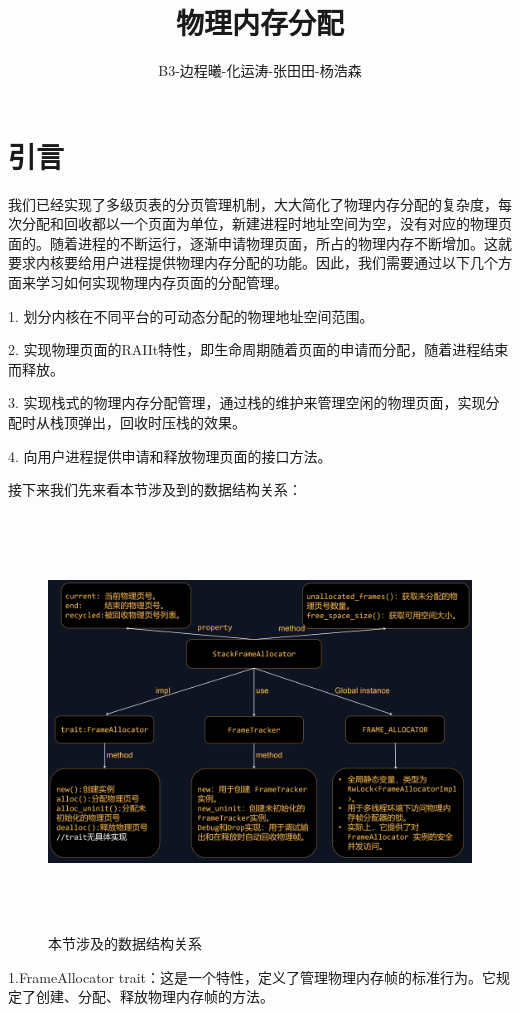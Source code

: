 \documentclass[12pt, a4paper]{ctexart}
\title{物理内存分配}
\author{B3-边程曦-化运涛-张田田-杨浩森}
\begin{document}
\justifying
	\clearpage
	\maketitle  
	\section{引言}
	我们已经实现了多级页表的分页管理机制，大大简化了物理内存分配的复杂度，每次分配和回收都以一个页面为单位，新建进程时地址空间为空，没有对应的物理页面的。随着进程的不断运行，逐渐申请物理页面，所占的物理内存不断增加。这就要求内核要给用户进程提供物理内存分配的功能。因此，我们需要通过以下几个方面来学习如何实现物理内存页面的分配管理。
	
	1. 划分内核在不同平台的可动态分配的物理地址空间范围。
	
	2. 实现物理页面的RAIIt特性，即生命周期随着页面的申请而分配，随着进程结束而释放。
	
	3. 实现栈式的物理内存分配管理，通过栈的维护来管理空闲的物理页面，实现分配时从栈顶弹出，回收时压栈的效果。
	
	4. 向用户进程提供申请和释放物理页面的接口方法。
	
	接下来我们先来看本节涉及到的数据结构关系：
\clearpage
\begin{figure}[h]
		\centering
		\includegraphics[width=14cm,height=11cm]{2.png}
		\caption{本节涉及的数据结构关系}
\end{figure}    
\justifying  
1.FrameAllocator trait：这是一个特性，定义了管理物理内存帧的标准行为。它规定了创建、分配、释放物理内存帧的方法。
\end{document}
